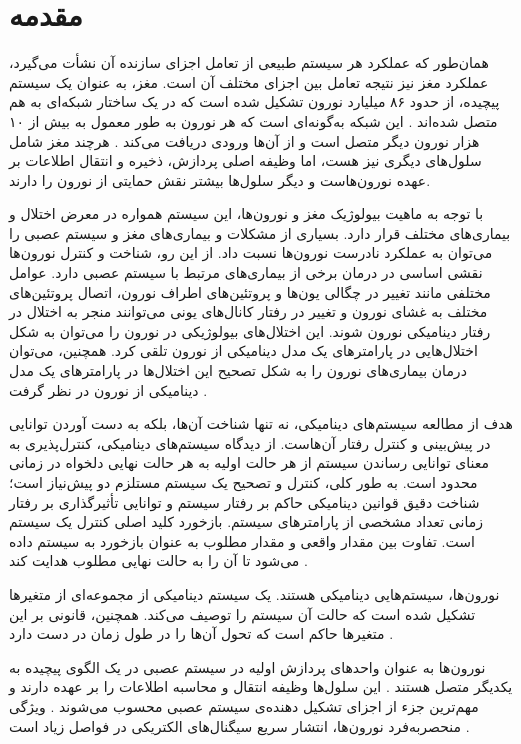 \chapter{مقدمه}

همان‌طور که عملکرد هر سیستم طبیعی از تعامل اجزای سازنده آن نشأت می‌گیرد، عملکرد مغز نیز نتیجه تعامل بین اجزای مختلف آن است.
مغز، به عنوان یک سیستم پیچیده، از حدود ۸۶ میلیارد نورون تشکیل شده است که در یک ساختار شبکه‌ای به هم متصل شده‌اند
\cite{herculano-houzel2009}.
این شبکه به‌گونه‌ای است که هر نورون به طور معمول به بیش از ۱۰ هزار نورون دیگر متصل است و از آن‌ها ورودی دریافت می‌کند
\cite{izhikevich2006,trappenberg2022}.
هرچند مغز شامل سلول‌های دیگری نیز هست، اما وظیفه اصلی پردازش، ذخیره و انتقال اطلاعات بر عهده نورون‌هاست و دیگر سلول‌ها بیشتر نقش حمایتی از نورون را دارند.

با توجه به ماهیت بیولوژیک مغز و نورون‌ها، این سیستم همواره در معرض اختلال و بیماری‌های مختلف قرار دارد.
بسیاری از مشکلات و بیماری‌های مغز و سیستم عصبی را می‌توان به عملکرد نادرست نورون‌ها نسبت داد.
از این رو، شناخت و کنترل نورون‌ها نقشی اساسی در درمان برخی از بیماری‌های مرتبط با سیستم عصبی دارد.
عوامل مختلفی مانند تغییر در چگالی یون‌ها و پروتئین‌های اطراف نورون، اتصال پروتئین‌های مختلف به غشای نورون و تغییر در رفتار کانال‌های یونی می‌توانند منجر به اختلال در رفتار دینامیکی نورون شوند.
این اختلال‌های بیولوژیکی در نورون را می‌توان به شکل اختلال‌هایی در پارامترهای یک مدل دینامیکی از نورون تلقی کرد.
همچنین، می‌توان درمان بیماری‌های نورون را به شکل تصحیح این اختلال‌ها در پارامترهای یک مدل دینامیکی از نورون در نظر گرفت
\cite{shaw2017}.

هدف از مطالعه سیستم‌های دینامیکی، نه تنها شناخت آن‌ها، بلکه به دست آوردن توانایی در پیش‌بینی و کنترل رفتار آن‌هاست.
از دیدگاه سیستم‌های دینامیکی، کنترل‌پذیری به معنای توانایی رساندن سیستم از هر حالت اولیه به هر حالت نهایی دلخواه در زمانی محدود است.
به طور کلی، کنترل و تصحیح یک سیستم مستلزم دو پیش‌نیاز است؛
شناخت دقیق قوانین دینامیکی حاکم بر رفتار سیستم و توانایی تأثیرگذاری بر رفتار زمانی تعداد مشخصی از پارامترهای سیستم.
بازخورد کلید اصلی کنترل یک سیستم است.
تفاوت بین مقدار واقعی و مقدار مطلوب به عنوان بازخورد به سیستم داده می‌شود تا آن را به حالت نهایی مطلوب هدایت کند
\cite{liu2016,boccaletti2000}.

نورون‌ها، سیستم‌هایی دینامیکی هستند.
یک سیستم دینامیکی از مجموعه‌ای از متغیرها تشکیل شده است که حالت آن سیستم را توصیف می‌کند.
همچنین، قانونی بر این متغیرها حاکم است که تحول آن‌ها را در طول زمان در دست دارد
\cite{izhikevich2006}.

نورون‌ها به عنوان واحدهای پردازش اولیه در سیستم عصبی در یک الگوی پیچیده به یکدیگر متصل هستند
\cite{gerstner2002}.
این سلول‌ها وظیفه انتقال و محاسبه اطلاعات را بر عهده دارند و مهم‌ترین جزء از اجزای تشکیل دهنده‌ی سیستم عصبی محسوب می‌شوند
\cite{graben2008}.
ویژگی منحصربه‌فرد نورون‌ها، انتشار سریع سیگنال‌های الکتریکی در فواصل زیاد است
\cite{dayan2001}.

